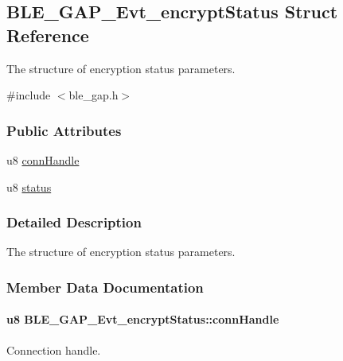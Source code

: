 \hypertarget{struct_b_l_e___g_a_p___evt__encrypt_status}{}\subsection{B\+L\+E\+\_\+\+G\+A\+P\+\_\+\+Evt\+\_\+encrypt\+Status Struct Reference}
\label{struct_b_l_e___g_a_p___evt__encrypt_status}


The structure of encryption status parameters.  




{\ttfamily \#include $<$ble\+\_\+gap.\+h$>$}

\subsubsection*{Public Attributes}
\begin{DoxyCompactItemize}
\item 
u8 \hyperlink{struct_b_l_e___g_a_p___evt__encrypt_status_adb885575161f01211a429dda8addb47f}{conn\+Handle}
\item 
u8 \hyperlink{struct_b_l_e___g_a_p___evt__encrypt_status_a8843d3d93570cb6d7880757126c9d0a5}{status}
\end{DoxyCompactItemize}


\subsubsection{Detailed Description}
The structure of encryption status parameters. 

\subsubsection{Member Data Documentation}
\paragraph[{\texorpdfstring{conn\+Handle}{connHandle}}]{\setlength{\rightskip}{0pt plus 5cm}u8 B\+L\+E\+\_\+\+G\+A\+P\+\_\+\+Evt\+\_\+encrypt\+Status\+::conn\+Handle}\hypertarget{struct_b_l_e___g_a_p___evt__encrypt_status_adb885575161f01211a429dda8addb47f}{}\label{struct_b_l_e___g_a_p___evt__encrypt_status_adb885575161f01211a429dda8addb47f}
Connection handle. 
